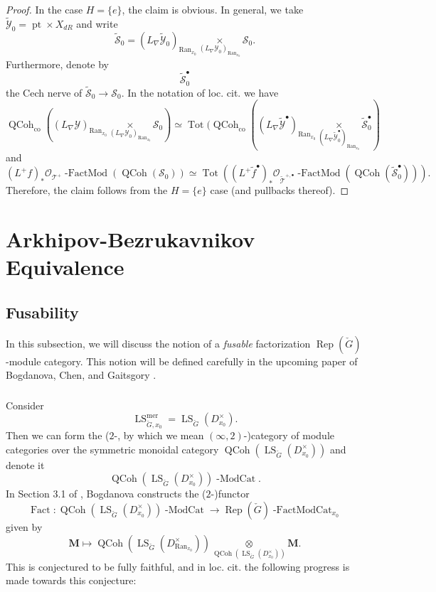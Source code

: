 \documentclass[10pt,a4paper]{amsart}
\newcommand{\on}[1]{\operatorname{#1}}
\newcommand{\QCoh}{\on{QCoh}}
\newcommand{\Gcheck}{\check{G}}
\newcommand{\Ran}{\on{Ran}}
\newcommand{\sssec}[1]{\subsubsection{}}
\begin{document}
\begin{proof}
    In the case $H = \{e\}$, the claim is obvious. In general, we take $\tilde{\mathcal{Y}}_0 = \on{pt} \times X_{dR}$ and write
    $$
    \tilde{\mathcal{S}}_0 = (L_{\nabla}\tilde{\mathcal{Y}}_0)_{\Ran_{x_0}} \underset{(L_{\nabla}\mathcal{Y}_0)_{\Ran_{x_0}}}{\times} \mathcal{S}_0.
    $$
    Furthermore, denote by
    $$
    \tilde{\mathcal{S}}_0^{\bullet}
    $$
    the Cech nerve of $\tilde{\mathcal{S}}_0 \to \mathcal{S}_0$.
    In the notation of loc. cit. we have
    $$
    \QCoh_{\on{co}}((L_{\nabla}\mathcal{Y})_{\Ran_{x_0}} \underset{(L_{\nabla}\mathcal{Y}_0)_{\Ran_{x_0}}}{\times} \mathcal{S}_0) \simeq \on{Tot}(\QCoh_{\on{co}}((L_{\nabla}\tilde{\mathcal{Y}}^{\bullet})_{\Ran_{x_0}} \underset{(L_{\nabla}\tilde{\mathcal{Y}}_0^{\bullet})_{\Ran_{x_0}}}{\times} \tilde{\mathcal{S}}_0^{\bullet})
    $$
    and
    $$
    (L^+f)_*\mathcal{O}_{\mathcal{T}^+}\on{-FactMod}(\QCoh(\mathcal{S}_0)) \simeq \on{Tot}((L^+\tilde{f}^{\bullet})_*\mathcal{O}_{\tilde{\mathcal{T}}^{+, \bullet}}\on{-FactMod}(\QCoh(\tilde{\mathcal{S}}_0^{\bullet}))).
    $$
    Therefore, the claim follows from the $H = \{e\}$ case (and pullbacks thereof).
    
\end{proof}



\section{Arkhipov-Bezrukavnikov Equivalence} \label{Section AB}

\subsection{Fusability} \label{Fusability}
In this subsection, we will discuss the notion of a \emph{fusable} factorization $\on{Rep}(\Gcheck)$-module category. This notion will be defined carefully in the upcoming paper of Bogdanova, Chen, and Gaitsgory \cite{BCG}.

\sssec{}
Consider
$$
\on{LS}_{\Gcheck, x_0}^{\on{mer}} = \on{LS}_{\Gcheck}(D_{x_0}^{\times}).
$$
Then we can form the ($2$-, by which we mean $(\infty, 2)$-)category of module categories over the symmetric monoidal category $\QCoh(\on{LS}_{\Gcheck}(D_{x_0}^{\times}))$ and denote it
$$
\QCoh(\on{LS}_{\Gcheck}(D_{x_0}^{\times}))\on{-ModCat}.
$$
In Section 3.1 of \cite{Katia}, Bogdanova constructs the ($2$-)functor
$$
\on{Fact} : \QCoh(\on{LS}_{\Gcheck}(D_{x_0}^{\times}))\on{-ModCat} \longrightarrow \on{Rep}(\Gcheck)\on{-FactModCat}_{x_0}
$$
given by
$$
\boldsymbol{M} \mapsto \QCoh(\on{LS}_{\Gcheck}(D_{\Ran_{x_0}}^{\times})) \underset{\QCoh(\on{LS}_{\Gcheck}(D_{x_0}^{\times}))}{\otimes} \boldsymbol{M}.
$$
This is conjectured to be fully faithful, and in loc. cit. the following progress is made towards this conjecture:
\end{document}
